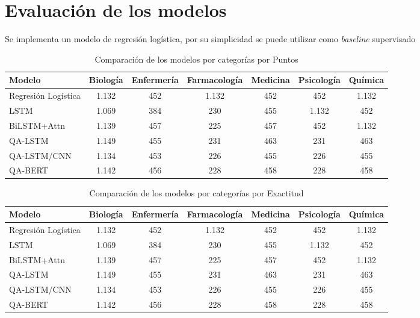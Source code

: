 \section{Evaluación de los modelos}

Se implementa un modelo de regresión logística, por su simplicidad se puede utilizar como \textit{baseline} supervisado 



\begin{table}[!tb]
  \begin{center}
    \caption{Comparación de los modelos por categorías por Puntos}
    \begin{tabular}{l|c|c|c|c|c|c}
      \textbf{Modelo} & \textbf{Biología} & \textbf{Enfermería} & \textbf{Farmacología} & \textbf{Medicina} & \textbf{Psicología} & \textbf{Química}\\
      \hline
      Regresión Logística & 1.132 & 452 & 1.132 & 452 & 452 & 1.132\\
      LSTM & 1.069 & 384 & 230 & 455 & 1.132 & 452 \\
      BiLSTM+Attn & 1.139 & 457 & 225 & 457 & 452 & 1.132 \\
      QA-LSTM & 1.149 & 455 & 231 & 463 & 231 & 463 \\
      QA-LSTM/CNN & 1.134 & 453 & 226 & 455 & 226 & 455 \\
      QA-BERT & 1.142 & 456 & 228 & 458 & 228 & 458 
    \end{tabular}
  \end{center}
  \label{comparison_points}
\end{table}


\begin{table}[!tb]
  \begin{center}
    \caption{Comparación de los modelos por categorías por Exactitud}
    \begin{tabular}{l|c|c|c|c|c|c}
      \textbf{Modelo} & \textbf{Biología} & \textbf{Enfermería} & \textbf{Farmacología} & \textbf{Medicina} & \textbf{Psicología} & \textbf{Química}\\
      \hline
      Regresión Logística & 1.132 & 452 & 1.132 & 452 & 452 & 1.132\\
      LSTM & 1.069 & 384 & 230 & 455 & 1.132 & 452 \\
      BiLSTM+Attn & 1.139 & 457 & 225 & 457 & 452 & 1.132 \\
      QA-LSTM & 1.149 & 455 & 231 & 463 & 231 & 463 \\
      QA-LSTM/CNN & 1.134 & 453 & 226 & 455 & 226 & 455 \\
      QA-BERT & 1.142 & 456 & 228 & 458 & 228 & 458 \\ 
    \end{tabular}
  \end{center}
  \label{comparison_acuracy}
\end{table}



